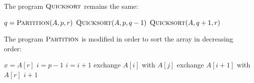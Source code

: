\documentclass[../Solutions_Introduction_to_Algorithms.tex]{subfiles}
\newif\ifanswer
\begin{document}
\begin{enumerate}[1.]
\ifanswer
{}
The program $\textsc{Quicksort}$ remains the same:
\begin{algorithm}
    \caption{$\textsc{Quicksort}(A, p, r)$}
    \begin{algorithmic}[1]
            \STATE $q = \textsc{Partition}(A, p, r)$
            \STATE $\textsc{Quicksort}(A, p, q - 1)$
            \STATE $\textsc{Quicksort}(A, q + 1, r)$
        \ENDIF
    \end{algorithmic}
\end{algorithm}
\newpage
The program $\textsc{Partition}$ is modified in order to sort the array in decreasing order:
\begin{algorithm}
    \caption{$\textsc{Partition'}(A, p, r)$}
    \begin{algorithmic}[1]
        \STATE $x = A[r]$
        \STATE $i = p - 1$
                \STATE $i = i + 1$
                \STATE exchange $A[i]$ with $A[j]$
            \ENDIF
        \ENDFOR
        \STATE exchange $A[i + 1]$ with $A[r]$
        \RETURN $i + 1$
    \end{algorithmic}
\end{algorithm}
\vspace{1cm}



\end{enumerate}
\end{document}
